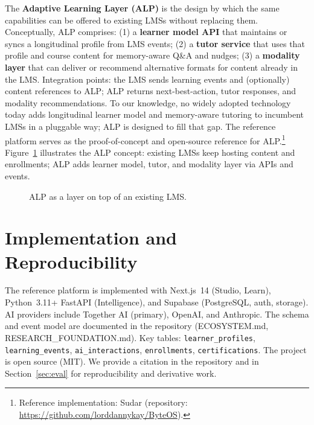 \documentclass[10pt,twocolumn]{article}
\begin{document}
The \textbf{Adaptive Learning Layer (ALP)} is the design by which the same capabilities can be offered to existing LMSs without replacing them. Conceptually, ALP comprises: (1) a \textbf{learner model API} that maintains or syncs a longitudinal profile from LMS events; (2) a \textbf{tutor service} that uses that profile and course content for memory-aware Q\&A and nudges; (3) a \textbf{modality layer} that can deliver or recommend alternative formats for content already in the LMS. Integration points: the LMS sends learning events and (optionally) content references to ALP; ALP returns next-best-action, tutor responses, and modality recommendations. To our knowledge, no widely adopted technology today adds longitudinal learner model and memory-aware tutoring to incumbent LMSs in a pluggable way; ALP is designed to fill that gap. The reference platform serves as the proof-of-concept and open-source reference for ALP.\footnote{Reference implementation: Sudar (repository: \url{https://github.com/lorddannykay/ByteOS}).} Figure~\ref{fig:alp} illustrates the ALP concept: existing LMSs keep hosting content and enrollments; ALP adds learner model, tutor, and modality layer via APIs and events.
\begin{figure}[t]
\centering
{}
\caption{ALP as a layer on top of an existing LMS.}
\label{fig:alp}
\end{figure}

\section{Implementation and Reproducibility}
\label{sec:impl}

The reference platform is implemented with Next.js~14 (Studio, Learn), Python~3.11+ FastAPI (Intelligence), and Supabase (PostgreSQL, auth, storage). AI providers include Together AI (primary), OpenAI, and Anthropic. The schema and event model are documented in the repository (ECOSYSTEM.md, RESEARCH\_FOUNDATION.md). Key tables: \texttt{learner\_profiles}, \texttt{learning\_events}, \texttt{ai\_interactions}, \texttt{enrollments}, \texttt{certifications}. The project is open source (MIT). We provide a citation in the repository and in Section~\ref{sec:eval} for reproducibility and derivative work.
\end{document}
